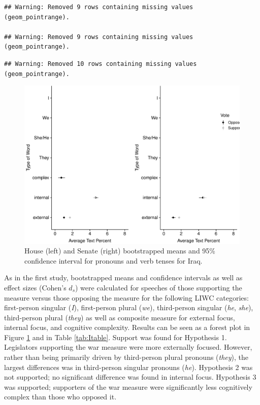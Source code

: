 \documentclass[english,,man,floatsintext]{apa6}
\begin{document}
\begin{verbatim}
## Warning: Removed 9 rows containing missing values (geom_pointrange).

## Warning: Removed 9 rows containing missing values (geom_pointrange).
\end{verbatim}

\begin{verbatim}
## Warning: Removed 10 rows containing missing values (geom_pointrange).
\end{verbatim}

\begin{figure}
\centering
\includegraphics{Language_of_War_Markdown_KJ2_files/figure-latex/Ipic-1.pdf}
\caption{\label{fig:Ipic}House (left) and Senate (right) bootstrapped means and 95\% confidence interval for pronouns and verb tenses for Iraq.}
\end{figure}

As in the first study, bootstrapped means and confidence intervals as well as effect sizes (Cohen's \(d_s\)) were calculated for speeches of those supporting the measure versus those opposing the measure for the following LIWC categories: first-person singular (\emph{I}), first-person plural (\emph{we}), third-person singular (\emph{he}, \emph{she}), third-person plural (\emph{they}) as well as composite measure for external focus, internal focus, and cognitive complexity. Results can be seen as a forest plot in Figure \ref{fig:Ipic} and in Table \ref{tab:Itable}. Support was found for Hypothesis 1. Legislators supporting the war measure were more externally focused. However, rather than being primarily driven by third-person plural pronouns (\emph{they}), the largest differences was in third-person singular pronouns (\emph{he}). Hypothesis 2 was not supported; no significant difference was found in internal focus. Hypothesis 3 was supported; supporters of the war measure were significantly less cognitively complex than those who opposed it.
\end{document}
